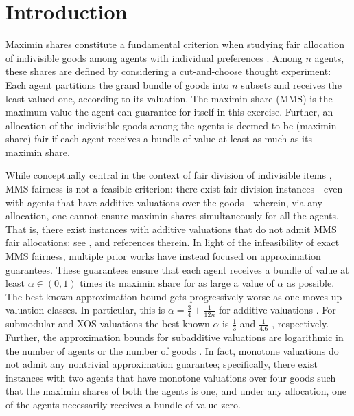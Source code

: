 \section{Introduction}
Maximin shares constitute a fundamental criterion when studying fair allocation of indivisible goods among agents with individual preferences \cite{hill1987partitioning,7c65302b-f079-361a-94f1-0c3c9f6fc76b}. Among $n$ agents, these shares are defined by considering a cut-and-choose thought experiment: Each agent partitions the grand bundle of goods into $n$ subsets and receives the least valued one, according to its valuation. The maximin share (MMS) is the maximum value the agent can guarantee for itself in this exercise. Further, an allocation of the indivisible goods among the agents is deemed to be (maximin share) fair if each agent receives a bundle of value at least as much as its maximin share. 

While conceptually central in the context of fair division of indivisible items \cite{amanatidis2023fair}, MMS fairness is not a feasible criterion: there exist fair division instances---even with agents that have additive valuations over the goods---wherein, via any allocation, one cannot ensure maximin shares simultaneously for all the agents. That is, there exist instances with additive valuations that do not admit MMS fair allocations; see \cite{10.1145/3140756,10.1145/2600057.2602835,feige2021tight}, and references therein. In light of the infeasibility of exact MMS fairness, multiple prior works have instead focused on approximation guarantees. These guarantees ensure that each agent receives a bundle of value at least $\alpha \in (0,1)$ times its maximin share for as large a value of $\alpha$ as possible. The best-known approximation bound gets progressively worse as one moves up valuation classes. In particular, this is $\alpha = \frac{3}{4} + \frac{1}{12n}$ for additive valuations \cite{10.1145/3391403.3399526}. For submodular and XOS valuations the best-known $\alpha$ is $\frac{1}{3}$ \cite{10.1145/3219166.3219238, barman2020approximation} and $\frac{1}{4.6}$ \cite{SEDDIGHIN2024104049}, respectively. Further, the approximation bounds for subadditive valuations are logarithmic in the number of agents \cite{SEDDIGHIN2024104049} or the number of goods \cite{10.1145/3219166.3219238}. In fact, monotone valuations do not admit any nontrivial approximation guarantee; specifically, there exist instances with two agents that have monotone valuations over four goods such that the maximin shares of both the agents is one, and under any allocation, one of the agents necessarily receives a bundle of value zero. 

